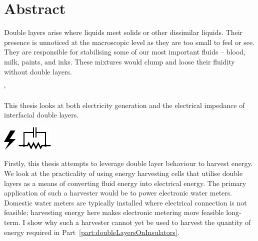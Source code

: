 





\rmfamily

\chapter*{Abstract}
  Double layers arise where liquids meet solids or other dissimilar liquids.
  Their presence is unnoticed at the macroscopic level as they are too small to feel or see.
  They are responsible for stabilising some of our most important fluids -- blood, milk, paints, and inks.
  These mixtures would clump and loose their fluidity without double layers.

  \vspace{-0.3cm}
  \begin{center}
    \parbox{8.8cm}{
     ` \begin{center}
        This thesis looks at both electricity generation and the electrical impedance of interfacial double layers.
      \end{center}
      \vspace{-1.35cm}
    }
    \vspace{-0.3cm}
    \parbox{15cm}{
        \hspace{0.8cm}
        \hbox{\vspace{-0.9cm}\includegraphics{graphics/logo_electricity}}
        \hbox{\hspace{9.8cm}\includegraphics{graphics/logo_impedance}}
    }
  \end{center}
  \vspace{0.5cm}

  Firstly, this thesis attempts to leverage double layer behaviour to harvest energy.
  We look at the practicality of using energy harvesting cells that utilise double layers as a means of converting fluid energy into electrical energy.
  The primary application of such a harvester would be to power electronic water meters.
  Domestic water meters are typically installed where electrical connection is not feasible; harvesting energy here makes electronic metering more feasible long-term.
  I show why such a harvester cannot yet be used to harvest the quantity of energy required in Part~\ref{part:doubleLayersOnInsulators}.

